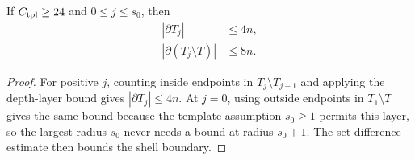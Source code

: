 \begin{lemma}
    \label{lem:area_law_template_ambient_boundary}
    \leanok
    If $C_{\rm tpl}\ge24$ and $0\le j\le s_0$, then
    \begin{align}
        |\partial T_j|             & \le4n, \\
        |\partial(T_j\setminus T)| & \le8n.
    \end{align}
\end{lemma}
\begin{proof}
    \leanok
    For positive $j$, counting inside endpoints in $T_j\setminus T_{j-1}$
    and applying the depth-layer bound gives $|\partial T_j|\le4n$. At $j=0$,
    using outside endpoints in $T_1\setminus T$ gives the same bound because the
    template assumption $s_0\ge1$ permits this layer, so the largest radius $s_0$
    never needs a bound at radius $s_0+1$. The set-difference estimate then bounds
    the shell boundary.
\end{proof}
